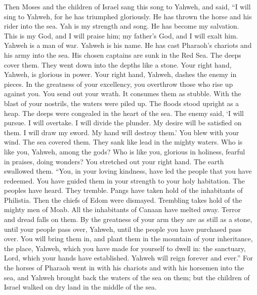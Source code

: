  Then Moses and the children of Israel sang this song to
Yahweh, and said, ``I will sing to Yahweh, for he has triumphed
gloriously. He has thrown the horse and his rider into the sea.
 Yah is my strength and song. He has become my salvation.
This is my God, and I will praise him; my father's God, and I will exalt
him.  Yahweh is a man of war. Yahweh is his name.
 He has cast Pharaoh's chariots and his army into the sea.
His chosen captains are sunk in the Red Sea.  The deeps
cover them. They went down into the depths like a stone. 
Your right hand, Yahweh, is glorious in power. Your right hand, Yahweh,
dashes the enemy in pieces.  In the greatness of your
excellency, you overthrow those who rise up against you. You send out
your wrath. It consumes them as stubble.  With the blast
of your nostrils, the waters were piled up. The floods stood upright as
a heap. The deeps were congealed in the heart of the sea. 
The enemy said, `I will pursue. I will overtake. I will divide the
plunder. My desire will be satisfied on them. I will draw my sword. My
hand will destroy them.'  You blew with your wind. The
sea covered them. They sank like lead in the mighty waters.
 Who is like you, Yahweh, among the gods? Who is like
you, glorious in holiness, fearful in praises, doing wonders?
 You stretched out your right hand. The earth swallowed
them.  ``You, in your loving kindness, have led the
people that you have redeemed. You have guided them in your strength to
your holy habitation.  The peoples have heard. They
tremble. Pangs have taken hold of the inhabitants of Philistia.
 Then the chiefs of Edom were dismayed. Trembling takes
hold of the mighty men of Moab. All the inhabitants of Canaan have
melted away.  Terror and dread falls on them. By the
greatness of your arm they are as still as a stone, until your people
pass over, Yahweh, until the people you have purchased pass over.
 You will bring them in, and plant them in the mountain
of your inheritance, the place, Yahweh, which you have made for yourself
to dwell in: the sanctuary, Lord, which your hands have established.
 Yahweh will reign forever and ever.'' 
For the horses of Pharaoh went in with his chariots and with his
horsemen into the sea, and Yahweh brought back the waters of the sea on
them; but the children of Israel walked on dry land in the middle of the
sea.

